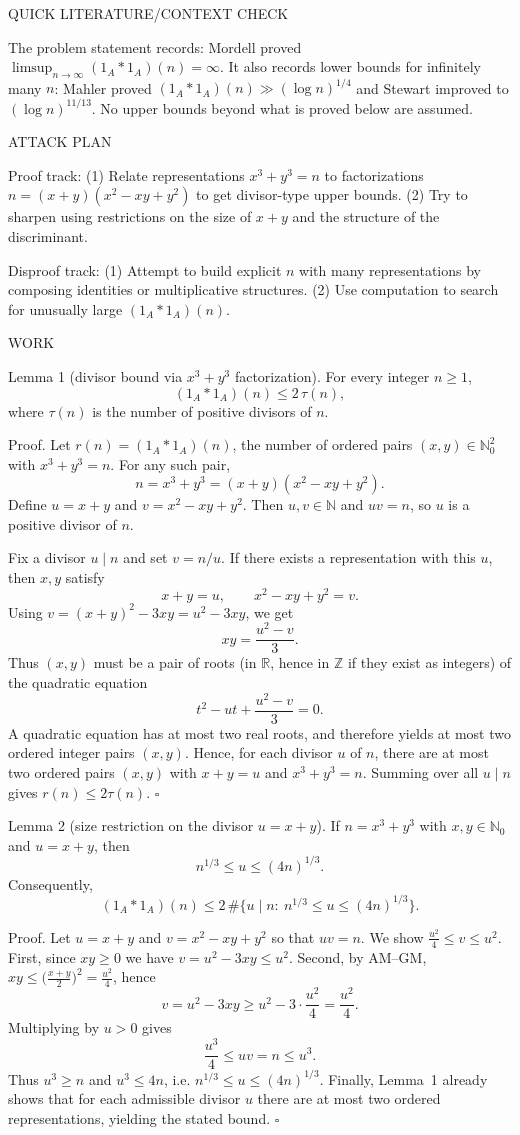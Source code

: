 QUICK LITERATURE/CONTEXT CHECK

The problem statement records: Mordell proved $\limsup_{n\to\infty} (1_A*1_A)(n)=\infty$.
It also records lower bounds for infinitely many $n$: Mahler proved $(1_A*1_A)(n)\gg (\log n)^{1/4}$ and Stewart improved to $(\log n)^{11/13}$.
No upper bounds beyond what is proved below are assumed.

ATTACK PLAN

Proof track:
(1) Relate representations $x^3+y^3=n$ to factorizations $n=(x+y)(x^2-xy+y^2)$ to get divisor-type upper bounds.
(2) Try to sharpen using restrictions on the size of $x+y$ and the structure of the discriminant.

Disproof track:
(1) Attempt to build explicit $n$ with many representations by composing identities or multiplicative structures.
(2) Use computation to search for unusually large $(1_A*1_A)(n)$.

WORK

Lemma 1 (divisor bound via $x^3+y^3$ factorization).
For every integer $n\ge 1$,
\[
(1_A*1_A)(n) \le 2\,\tau(n),
\]
where $\tau(n)$ is the number of positive divisors of $n$.

Proof.
Let $r(n)=(1_A*1_A)(n)$, the number of ordered pairs $(x,y)\in\mathbb{N}_0^2$ with $x^3+y^3=n$.
For any such pair,
\[
 n=x^3+y^3=(x+y)(x^2-xy+y^2).
\]
Define $u=x+y$ and $v=x^2-xy+y^2$.
Then $u,v\in\mathbb{N}$ and $uv=n$, so $u$ is a positive divisor of $n$.

Fix a divisor $u\mid n$ and set $v=n/u$.
If there exists a representation with this $u$, then $x,y$ satisfy
\[
 x+y=u,\qquad x^2-xy+y^2=v.
\]
Using $v=(x+y)^2-3xy=u^2-3xy$, we get
\[
 xy=\frac{u^2-v}{3}.
\]
Thus $(x,y)$ must be a pair of roots (in $\mathbb{R}$, hence in $\mathbb{Z}$ if they exist as integers) of the quadratic equation
\[
 t^2-u t + \frac{u^2-v}{3}=0.
\]
A quadratic equation has at most two real roots, and therefore yields at most two ordered integer pairs $(x,y)$.
Hence, for each divisor $u$ of $n$, there are at most two ordered pairs $(x,y)$ with $x+y=u$ and $x^3+y^3=n$.
Summing over all $u\mid n$ gives $r(n)\le 2\tau(n)$.
$\square$

Lemma 2 (size restriction on the divisor $u=x+y$).
If $n=x^3+y^3$ with $x,y\in\mathbb{N}_0$ and $u=x+y$, then
\[
 n^{1/3}\le u \le (4n)^{1/3}.
\]
Consequently,
\[
(1_A*1_A)(n) \le 2\,\#\bigl\{u\mid n:\ n^{1/3}\le u\le (4n)^{1/3}\bigr\}.
\]

Proof.
Let $u=x+y$ and $v=x^2-xy+y^2$ so that $uv=n$.
We show $\frac{u^2}{4}\le v\le u^2$.
First, since $xy\ge 0$ we have $v=u^2-3xy\le u^2$.
Second, by AM--GM, $xy\le \bigl(\frac{x+y}{2}\bigr)^2=\frac{u^2}{4}$, hence
\[
 v=u^2-3xy\ge u^2-3\cdot \frac{u^2}{4}=\frac{u^2}{4}.
\]
Multiplying by $u>0$ gives
\[
 \frac{u^3}{4} \le uv=n \le u^3.
\]
Thus $u^3\ge n$ and $u^3\le 4n$, i.e. $n^{1/3}\le u\le (4n)^{1/3}$.
Finally, Lemma~1 already shows that for each admissible divisor $u$ there are at most two ordered representations, yielding the stated bound.
$\square$

